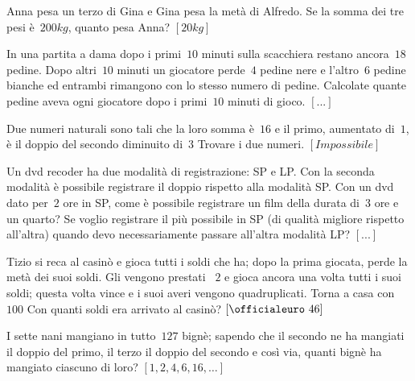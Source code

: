 \begin{multicols}{2}
\begin{esercizio}[\Ast]
\label{ese:14.51}
Anna pesa un terzo di Gina e Gina pesa la metà di Alfredo. Se la somma dei tre 
pesi è~$200\unit{kg}$, quanto pesa Anna? \hfill $\left[20\unit{kg}\right]$
\end{esercizio}

\begin{esercizio}
\label{ese:14.52}
In una partita a dama dopo i primi~$10$ minuti sulla scacchiera restano 
ancora~$18$ pedine. Dopo altri~$10$ minuti un giocatore perde~$4$ pedine nere e 
l'altro~$6$ pedine bianche ed entrambi rimangono con lo stesso numero di pedine. 
Calcolate quante pedine aveva ogni giocatore dopo i primi~$10$ minuti di gioco.
 \hfill $\left[...\right]$
\end{esercizio}

\begin{esercizio}[\Ast]
\label{ese:14.53}
Due numeri naturali sono tali che la loro somma è~$16$ e il primo, aumentato 
di~$1$, è il doppio del secondo diminuito di~$3$ Trovare i due numeri.
 \hfill $\left[Impossibile\right]$
\end{esercizio}

\begin{esercizio}
\label{ese:14.54}
Un dvd recoder ha due modalità di registrazione: SP e LP. Con la seconda 
modalità è possibile registrare il doppio rispetto alla modalità SP. Con un dvd 
dato per~$2$ ore in SP, come è possibile registrare un film della durata di~$3$ 
ore e un quarto? Se voglio registrare il più possibile in SP (di qualità 
migliore rispetto all'altra) quando devo necessariamente passare all'altra 
modalità LP? \hfill $\left[...\right]$
\end{esercizio}

\begin{esercizio}[\Ast]
\label{ese:14.55}
Tizio si reca al casinò e gioca tutti i soldi che ha; dopo la prima giocata, 
perde la metà dei suoi soldi. Gli vengono prestati \officialeuro~$2$ e gioca 
ancora una volta tutti i suoi soldi; questa volta vince e i suoi averi vengono 
quadruplicati. Torna a casa con \officialeuro~$100$ Con quanti soldi era 
arrivato al casinò? \hfill $\left[\officialeuro~46\right]$
\end{esercizio}

\begin{esercizio}[\Ast]
\label{ese:14.56}
I sette nani mangiano in tutto~$127$ bignè; sapendo che il secondo ne ha 
mangiati il doppio del primo, il terzo il doppio del secondo e così via, quanti 
bignè ha mangiato ciascuno di loro? \hfill $\left[1,2,4,6,16,\ldots\right]$
\end{esercizio}


\end{multicols}
